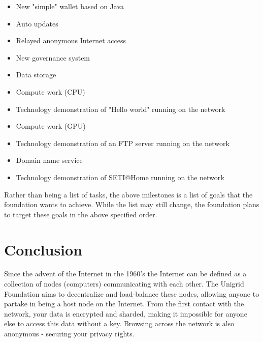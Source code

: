 \documentclass[a4paper,oneside]{article}
\begin{document}
\begin{itemize}
  \item New "simple" wallet based on Java
  \item Auto updates
  \item Relayed anonymous Internet access
  \item New governance system
  \item Data storage
  \item Compute work (CPU)
  \item Technology demonstration of "Hello world" running on the network
  \item Compute work (GPU)
  \item Technology demonstration of an FTP server running on the network
  \item Domain name service
  \item Technology demonstration of SETI@Home running on the network
\end{itemize}

\noindent Rather than being a list of tasks, the above milestones is a list of goals that the foundation wants to achieve. While the list may still change, the foundation plans to target these goals in the above specified order.

\section{Conclusion}
Since the advent of the Internet in the 1960's \cite{int1997} the Internet can be defined as a collection of nodes (computers) communicating with each other. The Unigrid Foundation aims to decentralize and load-balance these nodes, allowing anyone to partake in being a host node on the Internet. From the first contact with the network, your data is encrypted and sharded, making it impossible for anyone else to access this data without a key. Browsing across the network is also anonymous - securing your privacy rights.
\end{document}
